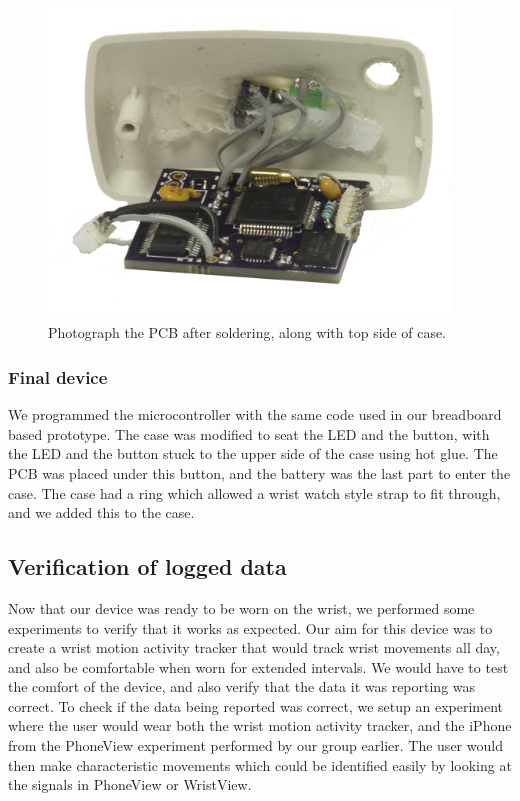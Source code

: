 \begin{figure}
\begin{center}
\includegraphics[width=0.95\textwidth]{images/PCBBare.jpg}
\caption{Photograph the PCB after soldering, along with top side of case.}
\label{Fig:PCBwithCase}
\end{center}
\end{figure}


\subsubsection{Final device}
\label{Sec:FinalDevice}
We programmed the microcontroller with the same code used in our breadboard based prototype.
The case was modified to seat the LED and the button,
with the LED and the button stuck to the upper side of the case using hot glue.
The PCB was placed under this button, and the battery was the last part to enter the case.
The case had a ring which allowed a wrist watch style strap to fit through,
and we added this to the case.

\subsection{Verification of logged data}
\label{Sec:Motion Data}
Now that our device was ready to be worn on the wrist,
we performed some experiments to verify that it works as expected.
Our aim for this device was to create a wrist motion activity tracker that would track wrist movements all day,
and also be comfortable when worn for extended intervals.
We would have to test the comfort of the device,
and also verify that the data it was reporting was correct.
To check if the data being reported was correct,
we setup an experiment where the user would wear both the wrist motion activity tracker,
and the iPhone from the PhoneView experiment performed by our group earlier.
The user would then make characteristic movements which could be identified easily by looking at the signals in PhoneView or WristView.